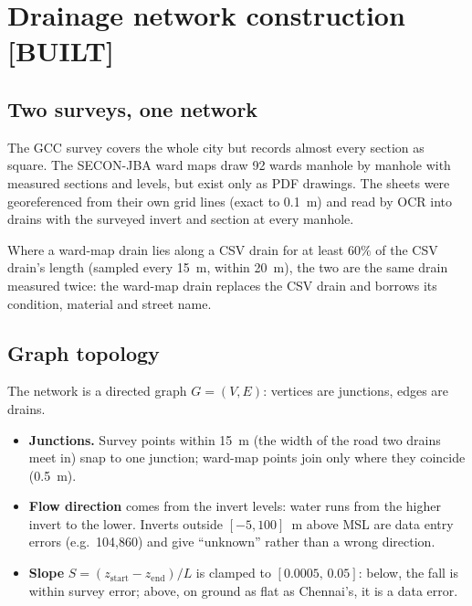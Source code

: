 \documentclass[11pt,a4paper]{article}
\newcommand{\built}{\textcolor{built}{\small\textbf{[BUILT]}}}
\begin{document}
\section{Drainage network construction \built}

\subsection{Two surveys, one network}
The GCC survey covers the whole city but records almost every section as square. The
SECON-JBA ward maps draw 92 wards manhole by manhole with measured sections and
levels, but exist only as PDF drawings. The sheets were georeferenced from their own
grid lines (exact to 0.1~m) and read by OCR into drains with the surveyed invert and
section at every manhole.

Where a ward-map drain lies along a CSV drain for at least $60\%$ of the CSV drain's
length (sampled every 15~m, within 20~m), the two are the same drain measured twice:
the ward-map drain replaces the CSV drain and borrows its condition, material and
street name.

\subsection{Graph topology}
The network is a directed graph $G=(V,E)$: vertices are junctions, edges are drains.
\begin{itemize}
  \item \textbf{Junctions.} Survey points within 15~m (the width of the road two drains
        meet in) snap to one junction; ward-map points join only where they coincide
        (0.5~m).
  \item \textbf{Flow direction} comes from the invert levels: water runs from the
        higher invert to the lower. Inverts outside $[-5, 100]$~m above MSL are data
        entry errors (e.g.\ 104,860) and give ``unknown'' rather than a wrong direction.
  \item \textbf{Slope} $S = (z_{\text{start}}-z_{\text{end}})/L$ is clamped to
        $[0.0005,\,0.05]$: below, the fall is within survey error; above, on ground as
        flat as Chennai's, it is a data error.
\end{itemize}
\end{document}
